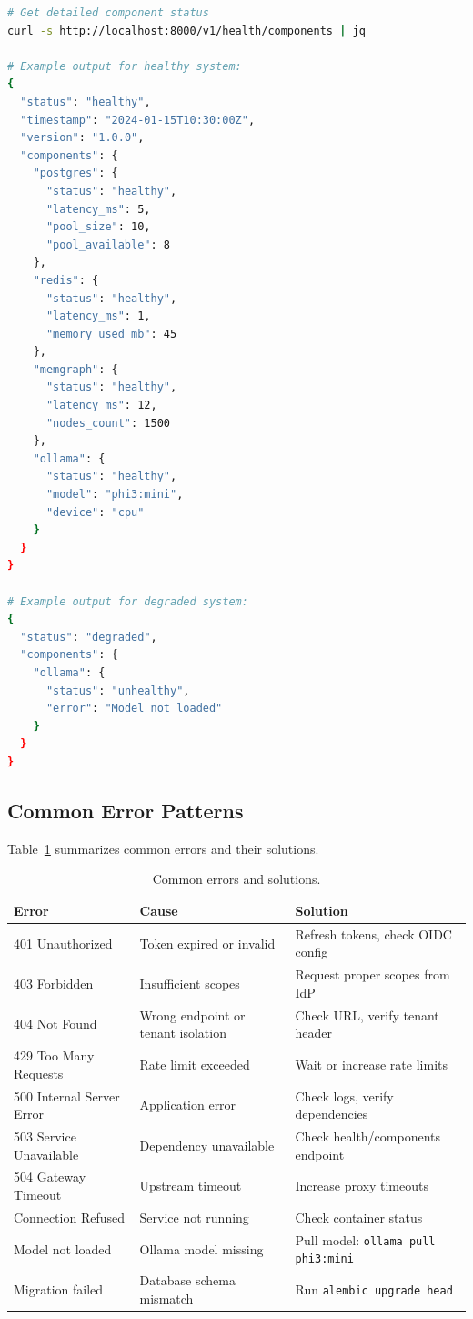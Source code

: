 \begin{lstlisting}[language=bash, caption=Comprehensive health check]
# Get detailed component status
curl -s http://localhost:8000/v1/health/components | jq

# Example output for healthy system:
{
  "status": "healthy",
  "timestamp": "2024-01-15T10:30:00Z",
  "version": "1.0.0",
  "components": {
    "postgres": {
      "status": "healthy",
      "latency_ms": 5,
      "pool_size": 10,
      "pool_available": 8
    },
    "redis": {
      "status": "healthy",
      "latency_ms": 1,
      "memory_used_mb": 45
    },
    "memgraph": {
      "status": "healthy",
      "latency_ms": 12,
      "nodes_count": 1500
    },
    "ollama": {
      "status": "healthy",
      "model": "phi3:mini",
      "device": "cpu"
    }
  }
}

# Example output for degraded system:
{
  "status": "degraded",
  "components": {
    "ollama": {
      "status": "unhealthy",
      "error": "Model not loaded"
    }
  }
}
\end{lstlisting}

\subsection{Common Error Patterns}

Table~\ref{tab:common-errors} summarizes common errors and their solutions.

\begin{table}[ht]
\centering
\caption{Common errors and solutions.}
\label{tab:common-errors}
\small
\begin{tabularx}{\textwidth}{lXX}
\hline
\textbf{Error} & \textbf{Cause} & \textbf{Solution} \\
\hline
401 Unauthorized & Token expired or invalid & Refresh tokens, check OIDC config \\
403 Forbidden & Insufficient scopes & Request proper scopes from IdP \\
404 Not Found & Wrong endpoint or tenant isolation & Check URL, verify tenant header \\
429 Too Many Requests & Rate limit exceeded & Wait or increase rate limits \\
500 Internal Server Error & Application error & Check logs, verify dependencies \\
503 Service Unavailable & Dependency unavailable & Check health/components endpoint \\
504 Gateway Timeout & Upstream timeout & Increase proxy timeouts \\
Connection Refused & Service not running & Check container status \\
Model not loaded & Ollama model missing & Pull model: \texttt{ollama pull phi3:mini} \\
Migration failed & Database schema mismatch & Run \texttt{alembic upgrade head} \\
\hline
\end{tabularx}
\end{table}

